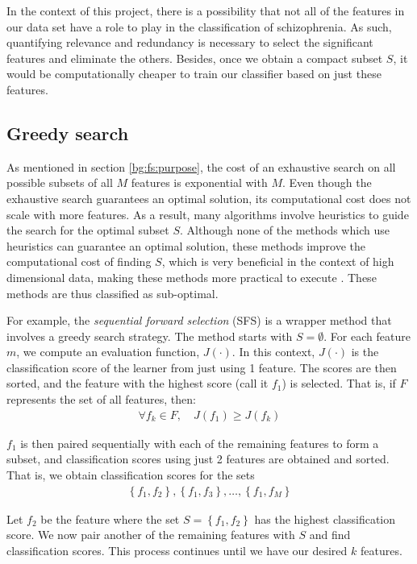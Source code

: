 \documentclass[12pt, twoside, a4paper]{report}
\begin{document}
In the context of this project, there is a possibility that not all of the features in our data set have a role to play in the classification of schizophrenia. As such, quantifying relevance and redundancy is necessary to select the significant features and eliminate the others. Besides, once we obtain a compact subset $S$, it would be computationally cheaper to train our classifier based on just these features.


\subsection{Greedy search} \label{bg:fs:greedy}
As mentioned in section \ref{bg:fs:purpose}, the cost of an exhaustive search on all possible subsets of all $M$ features is exponential with $M$. Even though the exhaustive search guarantees an optimal solution, its computational cost does not scale with more features. As a result, many algorithms involve heuristics to guide the search for the optimal subset $S$. Although none of the methods which use heuristics can guarantee an optimal solution, these methods improve the computational cost of finding $S$, which is very beneficial in the context of high dimensional data, making these methods more practical to execute \cite{RefWorks:140, RefWorks:182}. These methods are thus classified as sub-optimal.

For example, the \textit{sequential forward selection} (SFS) \cite{RefWorks:177} is a wrapper method that involves a greedy search strategy. The method starts with $S=\emptyset$. For each feature $m$, we compute an evaluation function, $J(\cdot)$. In this context, $J(\cdot)$ is the classification score of the learner from just using 1 feature. The scores are then sorted, and the feature with the highest score (call it $f_1$) is selected. That is, if $F$ represents the set of all features, then:
\begin{align*}
\forall f_k \in F, \quad J(f_1) \geq J(f_k)
\end{align*}

 $f_1$ is then paired sequentially with each of the remaining features to form a subset, and classification scores using just 2 features are obtained and sorted. That is, we obtain classification scores for the sets
\begin{align*}
\left\lbrace f_1, f_2 \right\rbrace, \left\lbrace f_1, f_3 \right\rbrace, \dots, \left\lbrace f_1, f_M \right\rbrace
\end{align*}
  
Let $f_2$ be the feature where the set $S= \left\lbrace f_1, f_2 \right\rbrace$ has the highest classification score. We now pair another of the remaining features with $S$ and find classification scores. This process continues until we have our desired $k$ features.
  
\end{document}
